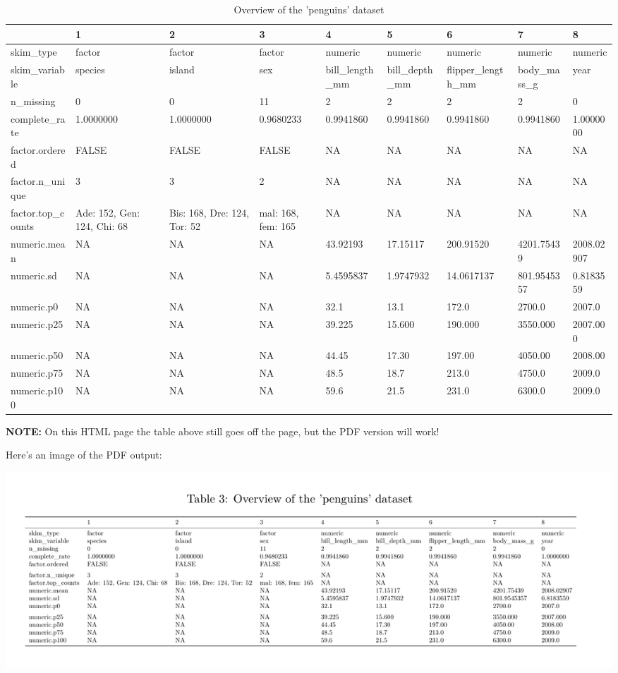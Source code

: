 \documentclass[
]{book}
\begin{document}
\begin{table}
\centering
\caption{\label{tab:unnamed-chunk-129}Overview of the 'penguins' dataset}
\centering
\begin{tabular}[t]{l|l|l|l|l|l|l|l|l}
\hline
  & 1 & 2 & 3 & 4 & 5 & 6 & 7 & 8\\
\hline
skim\_type & factor & factor & factor & numeric & numeric & numeric & numeric & numeric\\
\hline
skim\_variable & species & island & sex & bill\_length\_mm & bill\_depth\_mm & flipper\_length\_mm & body\_mass\_g & year\\
\hline
n\_missing & 0 & 0 & 11 & 2 & 2 & 2 & 2 & 0\\
\hline
complete\_rate & 1.0000000 & 1.0000000 & 0.9680233 & 0.9941860 & 0.9941860 & 0.9941860 & 0.9941860 & 1.0000000\\
\hline
factor.ordered & FALSE & FALSE & FALSE & NA & NA & NA & NA & NA\\
\hline
factor.n\_unique & 3 & 3 & 2 & NA & NA & NA & NA & NA\\
\hline
factor.top\_counts & Ade: 152, Gen: 124, Chi: 68 & Bis: 168, Dre: 124, Tor: 52 & mal: 168, fem: 165 & NA & NA & NA & NA & NA\\
\hline
numeric.mean & NA & NA & NA & 43.92193 & 17.15117 & 200.91520 & 4201.75439 & 2008.02907\\
\hline
numeric.sd & NA & NA & NA & 5.4595837 & 1.9747932 & 14.0617137 & 801.9545357 & 0.8183559\\
\hline
numeric.p0 & NA & NA & NA & 32.1 & 13.1 & 172.0 & 2700.0 & 2007.0\\
\hline
numeric.p25 & NA & NA & NA & 39.225 & 15.600 & 190.000 & 3550.000 & 2007.000\\
\hline
numeric.p50 & NA & NA & NA & 44.45 & 17.30 & 197.00 & 4050.00 & 2008.00\\
\hline
numeric.p75 & NA & NA & NA & 48.5 & 18.7 & 213.0 & 4750.0 & 2009.0\\
\hline
numeric.p100 & NA & NA & NA & 59.6 & 21.5 & 231.0 & 6300.0 & 2009.0\\
\hline
\end{tabular}
\end{table}

\textbf{NOTE: }
On this HTML page the table above still goes off the page, but the PDF version will work!

Here's an image of the PDF output:

\includegraphics[width=26.06in]{./more/second_kable}
\end{document}
